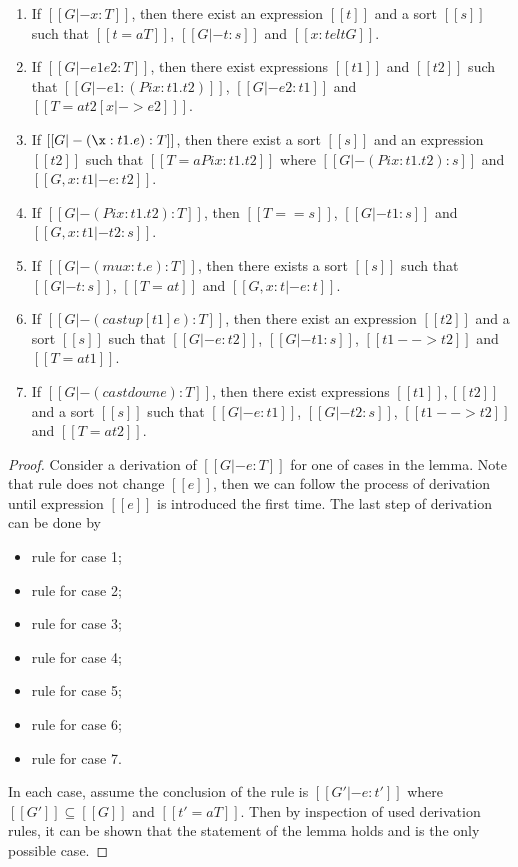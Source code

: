 \begin{lem}\label{lem:gen}
$\quad$
\begin{enumerate}[(1)]
	\item If $[[G |- x:T]]$, then there exist an expression $[[t]]$ and a sort $[[s]]$ such that $[[t =a T]]$, $[[G |- t:s]]$ and $[[x:t elt G]]$.
	\item If $[[G |- e1 e2:T]]$, then there exist expressions $[[t1]]$ and $[[t2]]$ such that $[[G |- e1 : (Pi x:t1.t2)]]$, $[[G |- e2:t1]]$ and $[[T =a t2[x |-> e2] ]]$.
	\item If $[[G |- (\x:t1.e):T]]$, then there exist a sort $[[s]]$ and an expression $[[t2]]$ such that $[[T =a Pi x:t1.t2]]$ where $[[G |- (Pi x:t1.t2):s]]$ and $[[G,x:t1 |- e:t2]]$.
    \item If $[[G |- (Pi x:t1.t2):T]]$, then $[[T == s]]$, $[[G |- t1:s]]$ and $[[G, x:t1 |- t2:s]]$.
	\item If $[[G |- (mu x:t.e):T]]$, then there exists a sort $[[s]]$ such that $[[G |- t:s]]$, $[[T =a t]]$ and $[[G, x:t|-e:t]]$.
	\item If $[[G |- (castup [t1] e):T]]$, then there exist an expression $[[t2]]$ and a sort $[[s]]$ such that $[[G |- e:t2]]$, $[[G |- t1:s]]$, $[[t1 --> t2]]$ and $[[T =a t1]]$.
	\item If $[[G |- (castdown e):T]]$, then there exist expressions $[[t1]],[[t2]]$ and a sort $[[s]]$ such that $[[G |- e:t1]]$, $[[G |- t2:s]]$, $[[t1 --> t2]]$ and $[[T =a t2]]$.
\end{enumerate}
\end{lem}

\begin{proof}
    Consider a derivation of $[[G |- e:T]]$ for one of cases in the lemma. Note that rule  does not change $[[e]]$, then we can follow the process of derivation until expression $[[e]]$ is introduced the first time. The last step of derivation can be done by
    \begin{itemize}
        \item rule  for case 1;
        \item rule  for case 2;
        \item rule  for case 3;
        \item rule  for case 4;
        \item rule  for case 5;
        \item rule  for case 6;
        \item rule  for case 7.
    \end{itemize}
    In each case, assume the conclusion of the rule is $[[G' |- e : t']]$ where $[[G']] \subseteq [[G]]$ and $[[t' =a T]]$. Then by inspection of used derivation rules, it can be shown that the statement of the lemma holds and is the only possible case.
\end{proof}

